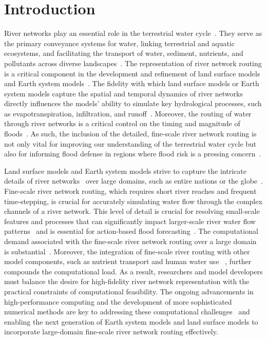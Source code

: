\documentclass[water,article,submit,pdftex,moreauthors]{Definitions/mdpi}
\begin{document}
\section{Introduction}

River networks play an essential role in the terrestrial water cycle~\cite{trenberth2007JHM}. They serve as the primary conveyance systems for water, linking terrestrial and aquatic ecosystems, and facilitating the transport of water, sediment, nutrients, and pollutants across diverse landscapes~\cite{dai2002JHM, dai2009JC, regnier2022N, sohail2022N, liu2019NC, li2019JAMES, aufdenkampe2011FEE}. The representation of river network routing is a critical component in the development and refinement of land surface models and Earth system models~\cite{david2016ESS}. The fidelity with which land surface models or Earth system models capture the spatial and temporal dynamics of river networks directly influences the models' ability to simulate key hydrological processes, such as evapotranspiration, infiltration, and runoff~\cite{senatore2015JAMES, wagner2016WRR}. Moreover, the routing of water through river networks is a critical control on the timing and magnitude of floods~\cite{lin2018JHM, alfieri2013HESS}. As such, the inclusion of the detailed, fine-scale river network routing is not only vital for improving our understanding of the terrestrial water cycle but also for informing flood defense in regions where flood risk is a pressing concern~\cite{willner2018NCC}.

Land surface models and Earth system models strive to capture the intricate details of river networks~\cite{lehner2013HP, yamazaki2019WRR, chaney2021GMD} over large domains, such as entire nations or the globe~\cite{yang2021BAMS, lin2019WRR, wu2012WRR, alfieri2013HESS}. Fine-scale river network routing, which requires short river reaches and frequent time-stepping, is crucial for accurately simulating water flow through the complex channels of a river network. This level of detail is crucial for resolving small-scale features and processes that can significantly impact larger-scale river water flow patterns~\cite{yamazaki2009HESS, thober2019GMD, mizukami2021JAMES, nguyen-quang2018GMD} and is essential for action-based flood forecasting~\cite{wada2016JAMES, coughlan_de_perez2016HESS}. The computational demand associated with the fine-scale river network routing over a large domain is substantial~\cite{yamazaki2013WRR, liu2014EMS, mizukami2021JAMES, david2015WRR, liu2023JH}. Moreover, the integration of fine-scale river routing with other model components, such as nutrient transport and human water use ~\cite{wada2016JAMES}, further compounds the computational load. As a result, researchers and model developers must balance the desire for high-fidelity river network representation with the practical constraints of computational feasibility. The ongoing advancements in high-performance computing and the development of more sophisticated numerical methods are key to addressing these computational challenges~\cite{yamazaki2013WRR, liu2014EMS, mizukami2021JAMES, david2015WRR, liu2023JH} and enabling the next generation of Earth system models and land surface models to incorporate large-domain fine-scale river network routing effectively.
\end{document}
